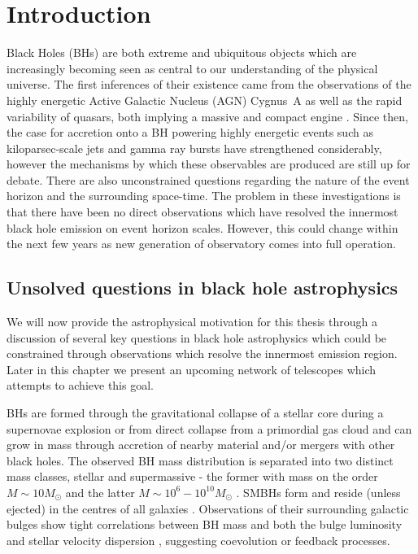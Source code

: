 \chapter{Introduction}
Black Holes (BHs) are both extreme and ubiquitous objects which are increasingly becoming seen as central to our understanding of the physical universe. The first inferences of their existence came from the observations of the highly energetic Active Galactic Nucleus (AGN) Cygnus~A as well as the rapid variability of quasars, both implying a massive and compact engine \citep[e.g.][and references therein]{Narayan_2013}. Since then, the case for accretion onto a BH powering highly energetic events such as kiloparsec-scale jets and gamma ray bursts have strengthened considerably, however the mechanisms by which these observables are produced are still up for debate. There are also unconstrained questions regarding the nature of the event horizon and the surrounding space-time. The problem in these investigations is that there have been no direct observations which have resolved the innermost black hole emission on event horizon scales. However, this could change within the next few years as new generation of observatory comes into full operation.

\section{Unsolved questions in black hole astrophysics}

We will now provide the astrophysical motivation for this thesis through a discussion of several key questions in black hole astrophysics which could be constrained through observations which resolve the innermost emission region. Later in this chapter we present an upcoming network of telescopes which attempts to achieve this goal. 


BHs are formed through the gravitational collapse of a stellar core during a supernovae explosion or from direct collapse from a primordial gas cloud and can grow in mass through accretion of nearby material and/or mergers with other black holes. The observed BH mass distribution is separated into two distinct mass classes, stellar and supermassive - the former with mass on the order $M \sim 10 M_\odot$ and the latter $M \sim 10^6 - 10^{10} M_\odot$ \citep{Falcke_2013}. SMBHs form and reside (unless ejected) in the centres of all galaxies \citep{Kormendy_1995}. Observations of their surrounding galactic bulges show tight correlations between BH mass and both the bulge luminosity and stellar velocity dispersion \citep{Magorrian_1998,Gebhardt_2000}, suggesting coevolution or feedback processes. 


